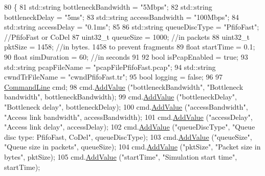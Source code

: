 \begin{DoxyCode}
80 \{
81   std::string bottleneckBandwidth = \textcolor{stringliteral}{"5Mbps"};
82   std::string bottleneckDelay = \textcolor{stringliteral}{"5ms"};
83   std::string accessBandwidth = \textcolor{stringliteral}{"100Mbps"};
84   std::string accessDelay = \textcolor{stringliteral}{"0.1ms"};
85 
86   std::string queueDiscType = \textcolor{stringliteral}{"PfifoFast"};       \textcolor{comment}{//PfifoFast or CoDel}
87   uint32\_t queueSize = 1000;      \textcolor{comment}{//in packets}
88   uint32\_t pktSize = 1458;        \textcolor{comment}{//in bytes. 1458 to prevent fragments}
89   \textcolor{keywordtype}{float} startTime = 0.1;
90   \textcolor{keywordtype}{float} simDuration = 60;        \textcolor{comment}{//in seconds}
91 
92   \textcolor{keywordtype}{bool} isPcapEnabled = \textcolor{keyword}{true};
93   std::string pcapFileName = \textcolor{stringliteral}{"pcapFilePfifoFast.pcap"};
94   std::string cwndTrFileName = \textcolor{stringliteral}{"cwndPfifoFast.tr"};
95   \textcolor{keywordtype}{bool} logging = \textcolor{keyword}{false};
96 
97   \hyperlink{classns3_1_1CommandLine}{CommandLine} cmd;
98   cmd.\hyperlink{classns3_1_1CommandLine_addcfb546c7ad4c8bd0965654d55beb8e}{AddValue} (\textcolor{stringliteral}{"bottleneckBandwidth"}, \textcolor{stringliteral}{"Bottleneck bandwidth"}, bottleneckBandwidth);
99   cmd.\hyperlink{classns3_1_1CommandLine_addcfb546c7ad4c8bd0965654d55beb8e}{AddValue} (\textcolor{stringliteral}{"bottleneckDelay"}, \textcolor{stringliteral}{"Bottleneck delay"}, bottleneckDelay);
100   cmd.\hyperlink{classns3_1_1CommandLine_addcfb546c7ad4c8bd0965654d55beb8e}{AddValue} (\textcolor{stringliteral}{"accessBandwidth"}, \textcolor{stringliteral}{"Access link bandwidth"}, accessBandwidth);
101   cmd.\hyperlink{classns3_1_1CommandLine_addcfb546c7ad4c8bd0965654d55beb8e}{AddValue} (\textcolor{stringliteral}{"accessDelay"}, \textcolor{stringliteral}{"Access link delay"}, accessDelay);
102   cmd.\hyperlink{classns3_1_1CommandLine_addcfb546c7ad4c8bd0965654d55beb8e}{AddValue} (\textcolor{stringliteral}{"queueDiscType"}, \textcolor{stringliteral}{"Queue disc type: PfifoFast, CoDel"}, queueDiscType);
103   cmd.\hyperlink{classns3_1_1CommandLine_addcfb546c7ad4c8bd0965654d55beb8e}{AddValue} (\textcolor{stringliteral}{"queueSize"}, \textcolor{stringliteral}{"Queue size in packets"}, queueSize);
104   cmd.\hyperlink{classns3_1_1CommandLine_addcfb546c7ad4c8bd0965654d55beb8e}{AddValue} (\textcolor{stringliteral}{"pktSize"}, \textcolor{stringliteral}{"Packet size in bytes"}, pktSize);
105   cmd.\hyperlink{classns3_1_1CommandLine_addcfb546c7ad4c8bd0965654d55beb8e}{AddValue} (\textcolor{stringliteral}{"startTime"}, \textcolor{stringliteral}{"Simulation start time"}, startTime);

\end{DoxyCode}

